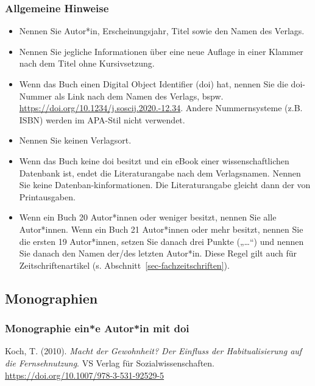 \documentclass[
  letterpaper,
  DIV=11]{scrreprt}
\begin{document}
\hypertarget{allgemeine-hinweise-2}{%
\subsubsection{\texorpdfstring{\textbf{Allgemeine
Hinweise}}{Allgemeine Hinweise}}\label{allgemeine-hinweise-2}}

\begin{itemize}
\item
  Nennen Sie Autor*in, Erscheinungsjahr, Titel sowie den Namen des
  Verlags.
\item
  Nennen Sie jegliche Informationen über eine neue Auflage in einer
  Klammer nach dem Titel ohne Kursivsetzung.
\item
  Wenn das Buch einen Digital Object Identifier (doi) hat, nennen Sie
  die doi-Nummer als Link nach dem Namen des Verlags, bspw.
  \url{https://doi.org/10.1234/j.soscij.2020.-12.34}. Andere
  Nummernsysteme (z.B. ISBN) werden im APA-Stil nicht verwendet.
\item
  Nennen Sie keinen Verlagsort.
\item
  Wenn das Buch keine doi besitzt und ein eBook einer wissenschaftlichen
  Datenbank ist, endet die Literaturangabe nach dem Verlagsnamen. Nennen
  Sie keine Datenban-kinformationen. Die Literaturangabe gleicht dann
  der von Printausgaben.
\item
  Wenn ein Buch 20 Autor*innen oder weniger besitzt, nennen Sie alle
  Autor*innen. Wenn ein Buch 21 Autor*innen oder mehr besitzt, nennen
  Sie die ersten 19 Autor*innen, setzen Sie danach drei Punkte
  („\ldots``) und nennen Sie danach den Namen der/des letzten Autor*in.
  Diese Regel gilt auch für Zeitschriftenartikel (s.
  Abschnitt~\ref{sec-fachzeitschriften}).
\end{itemize}

\hypertarget{monographien}{%
\subsection{Monographien}\label{monographien}}

\hypertarget{monographie-eine-autorin-mit-doi}{%
\subsubsection{Monographie \textbar{} ein*e Autor*in \textbar{} mit
doi}\label{monographie-eine-autorin-mit-doi}}

Koch, T. (2010). \emph{Macht der Gewohnheit? Der Einfluss der
Habitualisierung auf die Fernsehnutzung}. VS Verlag für
Sozialwissenschaften. \url{https://doi.org/10.1007/978-3-531-92529-5}
\end{document}
